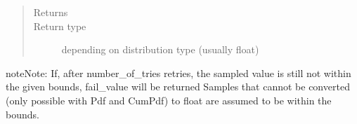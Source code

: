 \documentclass[letterpaper,10pt,english]{sphinxmanual}
\begin{document}
\begin{fulllineitems}
\begin{fulllineitems}
\begin{quote}
\begin{description}
\begin{itemize}
\end{itemize}

\item[{Returns}] \leavevmode
{}

\item[{Return type}] \leavevmode
depending on distribution type (usually float)

\end{description}\end{quote}

\begin{sphinxadmonition}{note}{Note:}
If, after number\_of\_tries retries, the sampled value is still not within the given bounds,
fail\_value  will be returned 
Samples that cannot be converted (only possible with Pdf and CumPdf) to float
are assumed to be within the bounds.
\end{sphinxadmonition}

\end{fulllineitems}


\end{fulllineitems}

\end{document}
